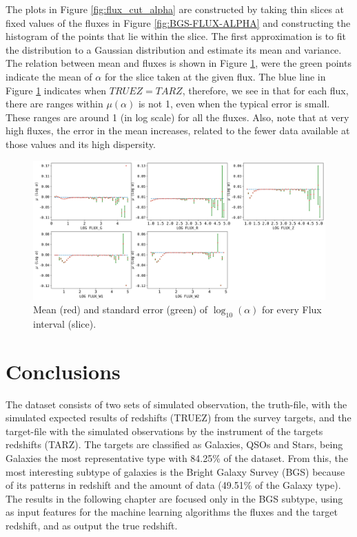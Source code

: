 The plots in Figure \ref{fig:flux_cut_alpha} are constructed by taking thin slices at fixed values of the fluxes in Figure \ref{fig:BGS-FLUX-ALPHA} and constructing the histogram of the points that lie within the slice. The first approximation is to fit the distribution to a Gaussian distribution and estimate its mean and variance. The relation between mean and fluxes is shown in Figure \ref{fig:media_alpha_flux}, were the green points indicate the mean of $\alpha$ for the slice taken at the given flux. The blue line in Figure \ref{fig:media_alpha_flux} indicates when $TRUEZ = TARZ$, therefore, we see in that for each flux, there are ranges within $\mu(\alpha)$ is not 1, even when the typical error is small. These ranges are around 1 (in log scale) for all the fluxes. Also, note that at very high fluxes, the error in the mean increases, related to the fewer data available at those values and its high dispersity. 
\begin{figure}[!htbp]
	\centering
	\includegraphics[width=1.0\linewidth]{TeX_files/Imagenes/media_alpha_flux}
	\caption{Mean (red) and standard error (green) of $\log_{10}(\alpha)$ for every Flux interval (slice).}
	\label{fig:media_alpha_flux}
\end{figure}

\section{Conclusions}
The dataset consists of two sets of simulated observation, the truth-file, with the simulated expected results of redshifts (TRUEZ) from the survey targets, and the target-file with the simulated observations by the instrument of the targets redshifts (TARZ). The targets are classified as Galaxies, QSOs and Stars, being Galaxies the most representative type with 84.25\% of the dataset. From this, the most interesting subtype of galaxies is the Bright Galaxy Survey (BGS) because of its patterns in redshift and the amount of data (49.51\% of the Galaxy type). The results in the following chapter are focused only in the BGS subtype, using as input features for the machine learning algorithms the fluxes and the target redshift, and as output the true redshift. 
